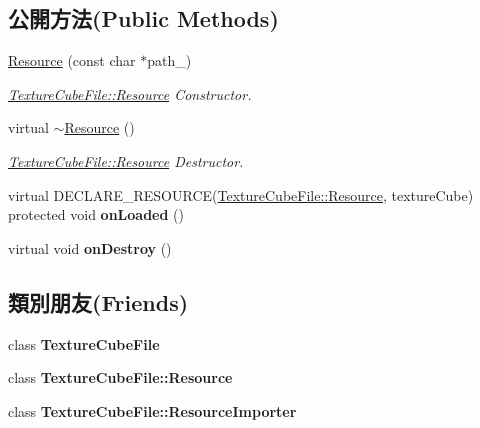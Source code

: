 \subsection*{公開方法(Public Methods)}
\begin{DoxyCompactItemize}
\item 
\hyperlink{class_magnum_1_1_texture_cube_file_1_1_resource_a9d2cab584b24e3007b58c2452200ea1f}{Resource} (const char $\ast$path\+\_\+)
\begin{DoxyCompactList}\small\item\em \hyperlink{class_magnum_1_1_texture_cube_file_1_1_resource}{Texture\+Cube\+File\+::\+Resource} Constructor. \end{DoxyCompactList}\item 
virtual \hyperlink{class_magnum_1_1_texture_cube_file_1_1_resource_abfc12309eb2f37daa741009cd5b22657}{$\sim$\+Resource} ()
\begin{DoxyCompactList}\small\item\em \hyperlink{class_magnum_1_1_texture_cube_file_1_1_resource}{Texture\+Cube\+File\+::\+Resource} Destructor. \end{DoxyCompactList}\item 
virtual D\+E\+C\+L\+A\+R\+E\+\_\+\+R\+E\+S\+O\+U\+R\+CE(\hyperlink{class_magnum_1_1_texture_cube_file_1_1_resource}{Texture\+Cube\+File\+::\+Resource}, texture\+Cube) protected void {\bfseries on\+Loaded} ()\hypertarget{class_magnum_1_1_texture_cube_file_1_1_resource_a16ae4b0c65da133f71570fa12ace5e4f}{}\label{class_magnum_1_1_texture_cube_file_1_1_resource_a16ae4b0c65da133f71570fa12ace5e4f}

\item 
virtual void {\bfseries on\+Destroy} ()\hypertarget{class_magnum_1_1_texture_cube_file_1_1_resource_aad4ab2be60d5e62223ed091f934a557e}{}\label{class_magnum_1_1_texture_cube_file_1_1_resource_aad4ab2be60d5e62223ed091f934a557e}

\end{DoxyCompactItemize}
\subsection*{類別朋友(Friends)}
\begin{DoxyCompactItemize}
\item 
class {\bfseries Texture\+Cube\+File}\hypertarget{class_magnum_1_1_texture_cube_file_1_1_resource_a5a4cc7500bfedf34cfa4a8a270cc6c13}{}\label{class_magnum_1_1_texture_cube_file_1_1_resource_a5a4cc7500bfedf34cfa4a8a270cc6c13}

\item 
class {\bfseries Texture\+Cube\+File\+::\+Resource}\hypertarget{class_magnum_1_1_texture_cube_file_1_1_resource_a6dd29e2fc99c16ad18aa9e40e44dcc05}{}\label{class_magnum_1_1_texture_cube_file_1_1_resource_a6dd29e2fc99c16ad18aa9e40e44dcc05}

\item 
class {\bfseries Texture\+Cube\+File\+::\+Resource\+Importer}\hypertarget{class_magnum_1_1_texture_cube_file_1_1_resource_abd0103c9043c92f29b4a7e3fe219a646}{}\label{class_magnum_1_1_texture_cube_file_1_1_resource_abd0103c9043c92f29b4a7e3fe219a646}

\end{DoxyCompactItemize}
